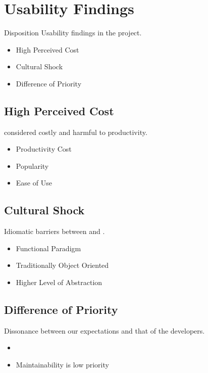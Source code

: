 \section{Usability Findings}
\begin{frame}{\secname}{Disposition}
	Usability findings in the project.
	\begin{itemize}
		\item High Perceived Cost
		\item Cultural Shock
		\item Difference of Priority
	\end{itemize}
\end{frame}

\subsection{High Perceived Cost}
\begin{frame}{\secname}{\subsecname}
	\fs considered costly and harmful to productivity.
	\begin{itemize}
		\item Productivity Cost
		\item Popularity
		\item Ease of Use
	\end{itemize}
\end{frame}

\subsection{Cultural Shock}
\begin{frame}{\secname}{\subsecname}
	Idiomatic barriers between \cs and \fs.
	\begin{itemize}
		\item Functional Paradigm
		\item Traditionally Object Oriented
		\item Higher Level of Abstraction
	\end{itemize}
\end{frame}

\subsection{Difference of Priority}
\begin{frame}{\secname}{\subsecname}
	Dissonance between our expectations and that of the developers.
	\begin{itemize}
		\item {}
		\item Maintainability is low priority
	\end{itemize}
\end{frame}

